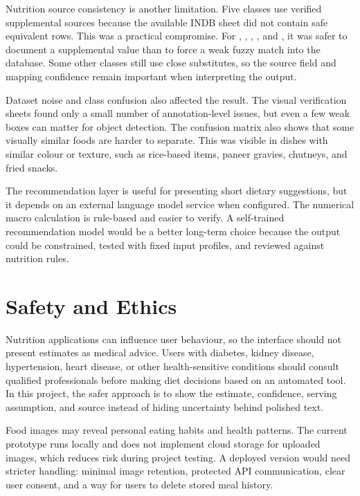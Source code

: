 Nutrition source consistency is another limitation. Five classes use verified supplemental sources because the available INDB sheet did not contain safe equivalent rows. This was a practical compromise. For , , , , and , it was safer to document a supplemental value than to force a weak fuzzy match into the database. Some other classes still use close substitutes, so the source field and mapping confidence remain important when interpreting the output.

Dataset noise and class confusion also affected the result. The visual verification sheets found only a small number of annotation-level issues, but even a few weak boxes can matter for object detection. The confusion matrix also shows that some visually similar foods are harder to separate. This was visible in dishes with similar colour or texture, such as rice-based items, paneer gravies, chutneys, and fried snacks.

The recommendation layer is useful for presenting short dietary suggestions, but it depends on an external language model service when configured. The numerical macro calculation is rule-based and easier to verify. A self-trained recommendation model would be a better long-term choice because the output could be constrained, tested with fixed input profiles, and reviewed against nutrition rules.

\section{Safety and Ethics}

Nutrition applications can influence user behaviour, so the interface should not present estimates as medical advice. Users with diabetes, kidney disease, hypertension, heart disease, or other health-sensitive conditions should consult qualified professionals before making diet decisions based on an automated tool. In this project, the safer approach is to show the estimate, confidence, serving assumption, and source instead of hiding uncertainty behind polished text.

Food images may reveal personal eating habits and health patterns. The current prototype runs locally and does not implement cloud storage for uploaded images, which reduces risk during project testing. A deployed version would need stricter handling: minimal image retention, protected API communication, clear user consent, and a way for users to delete stored meal history.

